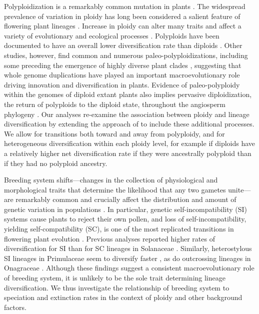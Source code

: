 Polyploidization is a remarkably common mutation in plants \citep{husband_2013, zenilferguson_2017}.
The widespread prevalence of variation in ploidy has long been considered a salient feature of flowering plant lineages \citep{stebbins1938}. 
Increase in ploidy can alter many traits and affect a variety of evolutionary and ecological processes \citep{ramsey_2002, sessa_2019}.
%
Polyploids have been documented to have an overall lower diversification rate than diploids \citep{mayrose_2011, mayrose_2015}. 
Other studies, however, find common and numerous paleo-polyploidizations, including some preceding the emergence of highly diverse plant clades \citep{soltis_2014, landis_2018}, suggesting that whole genome duplications have played an important macroevolutionary role driving innovation and diversification in plants. 
Evidence of paleo-polyploidy within the genomes of diploid extant plants also implies pervasive diploidization, the return of polyploids to the diploid state, throughout the angiosperm phylogeny \citep{soltis_2015, dodsworth_2015}.
Our analyses re-examine the association between ploidy and lineage diversification by extending the approach of \citep{mayrose_2011, mayrose_2015} to include these additional processes.
We allow for transitions both toward and away from polyploidy, and for heterogeneous diversification within each ploidy level, for example if diploids have a relatively higher net diversification rate if they were ancestrally polyploid than if they had no polyploid ancestry.

Breeding system shifts---changes in the collection of physiological and morphological traits that determine the likelihood that any two gametes unite---are remarkably common and crucially affect the distribution and amount of genetic variation in populations \citep{stebbins1974, barrett2013}.
In particular, genetic self-incompatibility (SI) systems cause plants to reject their own pollen, and loss of self-incompatibility, yielding self-compatibility (SC), is one of the most replicated transitions in flowering plant evolution \citep{stebbins1974, igic_2008}.
Previous analyses reported higher rates of diversification for SI than for SC lineages in Solanaceae \citep{goldberg_2010}. 
Similarly, heterostylous SI lineages in Primulaceae seem to diversify faster \citep{devos2014}, as do outcrossing lineages in Onagraceae \citep{freyman_2019}.
Although these findings suggest a consistent macroevolutionary role of breeding system, it is unlikely to be the sole trait determining lineage diversification.
We thus investigate the relationship of breeding system to speciation and extinction rates in the context of ploidy and other background factors.

